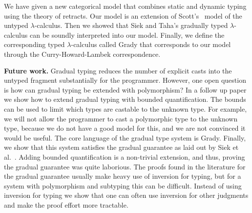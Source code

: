 We have given a new categorical model that combines static and dynamic
typing using the theory of retracts.  Our model is an extension of
Scott's~\cite{Scott:1980} model of the untyped $\lambda$-calculus.
Then we showed that Siek and Taha's gradually typed $\lambda$-calculus
\cite{Siek:2015} can be soundly interpreted into our model.  Finally,
we define the corresponding typed $\lambda$-calculus called Grady that
corresponds to our model through the Curry-Howard-Lambek
correspondence.

\textbf{Future work.}  Gradual typing reduces the number of explicit
casts into the untyped fragment substantially for the programmer.
However, one open question is how can gradual typing be extended with
polymorphism?  In a follow up paper we show how to extend gradual
typing with bounded quantification.  The bounds can be used to limit
which types are castable to the unknown type.  For example, we will
not allow the programmer to cast a polymorphic type to the unknown
type, because we do not have a good model for this, and we are not
convinced it would be useful.  The core language of the gradual type
system is Grady.  Finally, we show that this system satisfies the
gradual guarantee as laid out by Siek et al.~\cite{Siek:2015}.  Adding
bounded quantification is a non-trivial extension, and thus, proving
the gradual guarantee was quite laborious. The proofs found in the
literature for the gradual guarantee usually make heavy use of
inversion for typing, but for a system with polymorphism and subtyping
this can be difficult.  Instead of using inversion for typing we show
that one can often use inversion for other judgments and make the
proof effort more tractable.
